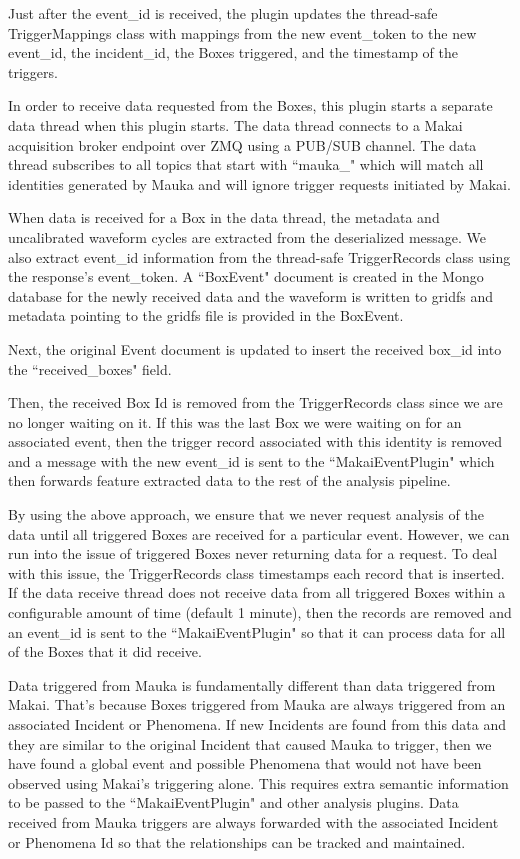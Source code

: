 Just after the event\_id is received, the plugin updates the thread-safe TriggerMappings class with mappings from the new event\_token to the new event\_id, the incident\_id, the Boxes triggered, and the timestamp of the triggers.

In order to receive data requested from the Boxes, this plugin starts a separate data thread when this plugin starts. The data thread connects to a Makai acquisition broker endpoint over ZMQ using a PUB/SUB channel. The data thread subscribes to all topics that start with ``mauka\_" which will match all identities generated by Mauka and will ignore trigger requests initiated by Makai.

When data is received for a Box in the data thread, the metadata and uncalibrated waveform cycles are extracted from the deserialized message. We also extract event\_id information from the thread-safe TriggerRecords class using the response's event\_token. A ``BoxEvent" document is created in the Mongo database for the newly received data and the waveform is written to gridfs and metadata pointing to the gridfs file is provided in the BoxEvent.

Next, the original Event document is updated to insert the received box\_id into the ``received\_boxes" field.

Then, the received Box Id is removed from the TriggerRecords class since we are no longer waiting on it. If this was the last Box we were waiting on for an associated event, then the trigger record associated with this identity is removed and a message with the new event\_id is sent to the ``MakaiEventPlugin" which then forwards feature extracted data to the rest of the analysis pipeline.

By using the above approach, we ensure that we never request analysis of the data until all triggered Boxes are received for a particular event. However, we can run into the issue of triggered Boxes never returning data for a request. To deal with this issue, the TriggerRecords class timestamps each record that is inserted. If the data receive thread does not receive data from all triggered Boxes within a configurable amount of time (default 1 minute), then the records are removed and an event\_id is sent to the ``MakaiEventPlugin" so that it can process data for all of the Boxes that it did receive.

Data triggered from Mauka is fundamentally different than data triggered from Makai. That's because Boxes triggered from Mauka are always triggered from an associated Incident or Phenomena. If new Incidents are found from this data and they are similar to the original Incident that caused Mauka to trigger, then we have found a global event and possible Phenomena that would not have been observed using Makai's triggering alone. This requires extra semantic information to be passed to the ``MakaiEventPlugin" and other analysis plugins. Data received from Mauka triggers are always forwarded with the associated Incident or Phenomena Id so that the relationships can be tracked and maintained.

